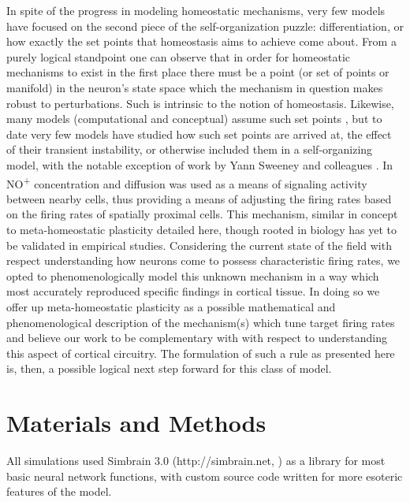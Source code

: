 \documentclass[10pt,letterpaper]{article}
\begin{document}
In spite of the progress in modeling homeostatic mechanisms, very few models have focused on the second piece of the self-organization puzzle: differentiation, or how exactly the set points that homeostasis aims to achieve come about. From a purely logical standpoint one can observe that in order for homeostatic mechanisms to exist in the first place there must be a point (or set of points or manifold) in the neuron's state space which the mechanism in question makes robust to perturbations. Such is intrinsic to the notion of homeostasis. Likewise, many models (computational and conceptual) assume such set points \cite{o2014cell, turrigiano2007homeostatic, davis2006homeostatic, lazar2009sorn, zheng2013network, miner2016plasticity, effenberger2015self}, but to date very few models have studied how such set points are arrived at, the effect of their transient instability, or otherwise included them in a self-organizing model, with the notable exception of work by Yann Sweeney and colleagues \cite{sweeney2015diffusive}. In \cite{sweeney2015diffusive} NO\textsuperscript{+} concentration and diffusion was used as a means of signaling activity between nearby cells, thus providing a means of adjusting the firing rates based on the firing rates of spatially proximal cells. This mechanism, similar in concept to meta-homeostatic plasticity detailed here, though rooted in biology has yet to be validated in empirical studies. Considering the current state of the field with respect understanding how neurons come to possess characteristic firing rates, we opted to phenomenologically model this unknown mechanism in a way which most accurately reproduced specific findings in cortical tissue. In doing so we offer up meta-homeostatic plasticity as a possible mathematical and phenomenological description of the mechanism(s) which tune target firing rates and believe our work to be complementary with \cite{sweeney2015diffusive} with respect to understanding this aspect of cortical circuitry. The formulation of such a rule as presented here is, then, a possible logical next step forward for this class of model.

\section*{Materials and Methods}
\label{sec:Methods}

All simulations used Simbrain 3.0 (http://simbrain.net, \cite{tosi2016simbrain}) as a library for most basic neural network functions, with custom source code written for more esoteric features of the model.
\end{document}
